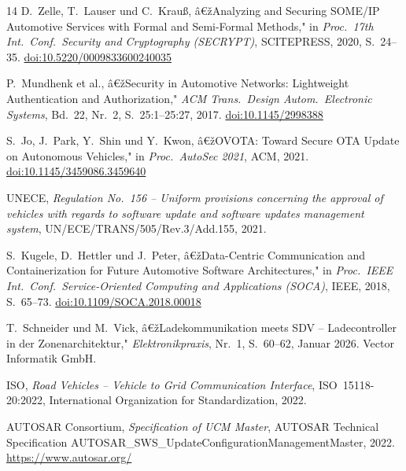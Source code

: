 ﻿\documentclass[12pt,a4paper,twoside]{article}
\begin{document}
\begin{thebibliography}{14}
D.~Zelle, T.~Lauser und C.~Krau{\ss}, â€žAnalyzing and Securing SOME/IP
Automotive Services with Formal and Semi-Formal Methods," in
\textit{Proc.\ 17th Int.\ Conf.\ Security and Cryptography (SECRYPT)},
SCITEPRESS, 2020, S.~24--35.
\href{https://doi.org/10.5220/0009833600240035}{doi:10.5220/0009833600240035}

P.~Mundhenk et al., â€žSecurity in Automotive Networks: Lightweight
Authentication and Authorization," \textit{ACM Trans.\ Design Autom.\
Electronic Systems}, Bd.~22, Nr.~2, S.~25:1--25:27, 2017.
\href{https://doi.org/10.1145/2998388}{doi:10.1145/2998388}

S.~Jo, J.~Park, Y.~Shin und Y.~Kwon, â€žOVOTA: Toward Secure OTA Update
on Autonomous Vehicles," in \textit{Proc.\ AutoSec 2021},
ACM, 2021.
\href{https://doi.org/10.1145/3459086.3459640}{doi:10.1145/3459086.3459640}

UNECE, \textit{Regulation No.~156 -- Uniform provisions concerning the
approval of vehicles with regards to software update and software updates
management system}, UN/ECE/TRANS/505/Rev.3/Add.155, 2021.

S.~Kugele, D.~Hettler und J.~Peter, â€žData-Centric Communication and
Containerization for Future Automotive Software Architectures," in
\textit{Proc.\ IEEE Int.\ Conf.\ Service-Oriented Computing and Applications
(SOCA)}, IEEE, 2018, S.~65--73.
\href{https://doi.org/10.1109/SOCA.2018.00018}{doi:10.1109/SOCA.2018.00018}

T.~Schneider und M.~Vick, â€žLadekommunikation meets SDV -- Ladecontroller in
der Zonenarchitektur," \textit{Elektronikpraxis}, Nr.~1, S.~60--62, Januar 2026.
Vector Informatik GmbH.

ISO, \textit{Road Vehicles -- Vehicle to Grid Communication Interface},
ISO~15118-20:2022, International Organization for Standardization, 2022.

AUTOSAR Consortium, \textit{Specification of UCM Master},
AUTOSAR Technical Specification
AUTOSAR\_SWS\_UpdateConfigurationManagementMaster, 2022.
\url{https://www.autosar.org/}

\end{thebibliography}



\printglossary[type=\acronymtype,title=AbkÃ¼rzungsverzeichnis]
\end{document}

